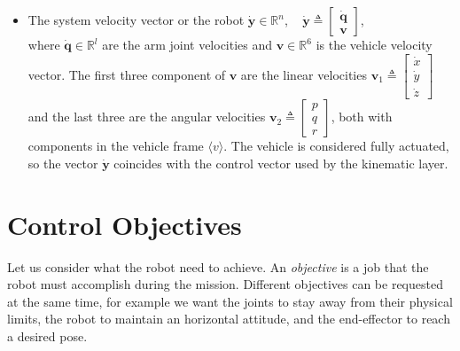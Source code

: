 \begin{itemize}
	\item The system velocity vector or the robot $\dot{\boldsymbol{y}} \in \mathbb{R}^n$, ~
	$\dot{\boldsymbol{y}} \triangleq 
	\begin{bmatrix}\dot{\boldsymbol{q}} \\ \boldsymbol{v}\end{bmatrix}$,\\
	where $\dot{\boldsymbol{q}} \in \mathbb{R}^{l}$ are the arm joint velocities and $\boldsymbol{v} \in \mathbb{R}^{6}$ is the vehicle velocity vector. The first three component of $\boldsymbol{v}$ are the linear velocities $\boldsymbol{v}_1 \triangleq \begin{bmatrix}\dot{x} \\ \dot{y} \\ \dot{z}\end{bmatrix}$ and the last three are the angular velocities $\boldsymbol{v}_2 \triangleq \begin{bmatrix}p \\ q \\ r\end{bmatrix}$, both with components in the vehicle frame $\langle v \rangle$. The vehicle is considered fully actuated, so the vector $\dot{\boldsymbol{y}}$ coincides with the control vector used by the kinematic layer.
\end{itemize}
	
\section{Control Objectives}
\label{sec:controlObjectives}
Let us consider what the robot need to achieve. An \textit{objective} is a job that the robot must accomplish during the mission. Different objectives can be requested at the same time, for example we want the joints to stay away from their physical limits, the robot to maintain an horizontal attitude, and the end-effector to reach a desired pose.
